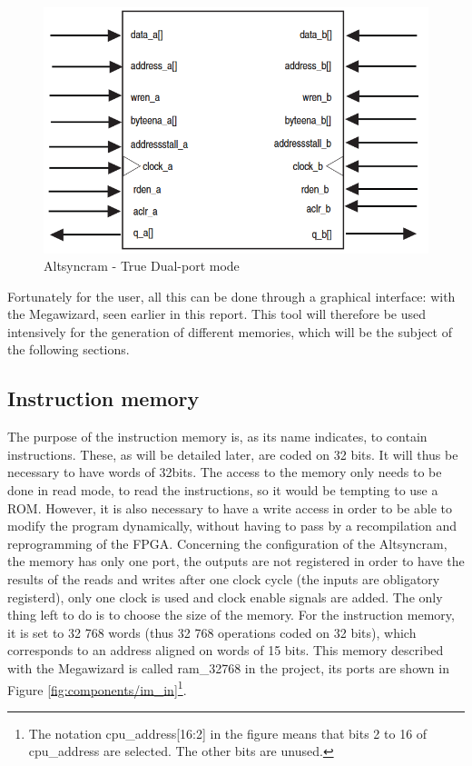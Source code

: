\begin{figure}[H]
    \centering
    \includegraphics[scale=0.6]{Chapter3-CPU/res/altsyncram.PNG}
    \caption{Altsyncram - True Dual-port mode}
    \label{fig:memories/altsyncram}
\end{figure}

Fortunately for the user, all this can be done through a graphical interface: with the Megawizard, 
seen earlier in this report. This tool will therefore be used intensively for the generation of 
different memories, which will be the subject of the following sections.

\subsection{Instruction memory}

The purpose of the instruction memory is, as its name indicates, to contain instructions. These, as 
will be detailed later, are coded on 32 bits. It will thus be necessary to have words of 32bits. The 
access to the memory only needs to be done in read mode, to read the instructions, so it would be tempting 
to use a ROM. However, it is also necessary to have a write access in order to be able to modify the 
program dynamically, without having to pass by a recompilation and reprogramming of the FPGA. 
Concerning the configuration of the Altsyncram, the 
memory has only one port, the outputs are not registered in order to have the results of the reads 
and writes after one clock cycle (the inputs are obligatory registerd), only one clock is used and 
clock enable signals are added. The only thing left to do is to choose the size of the memory. For 
the instruction memory, it is set to 32 768 words (thus 32 768 operations coded on 32 bits), which 
corresponds to an address aligned on words of 15 bits. This memory described with the Megawizard 
is called ram\_32768 in the project, its ports are shown in Figure \ref{fig:components/im_in}\footnote{
The notation cpu\_address[16:2] in the figure means that bits 2 to 16 of cpu\_address are selected. 
The other bits are unused.}.

